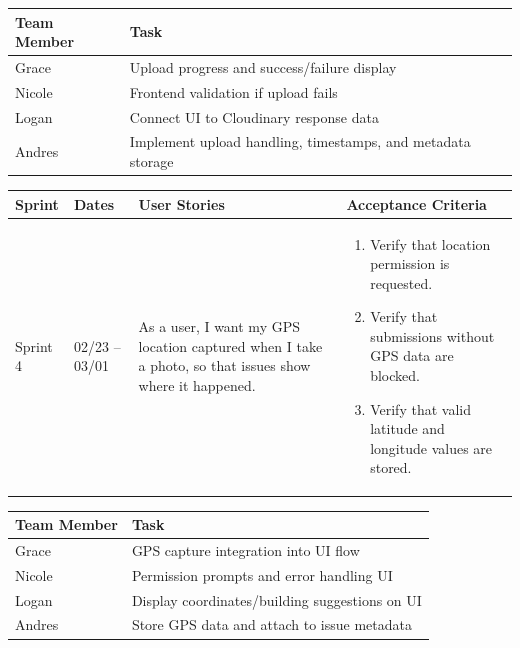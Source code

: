 \documentclass[11pt]{article}
\begin{document}
\vspace{0.5em}

\noindent
\begin{tabular}{|L{2.5cm}|L{12.5cm}|}
\hline
\textbf{Team Member} & \textbf{Task} \\
\hline
Grace & Upload progress and success/failure display \\
\hline
Nicole & Frontend validation if upload fails \\
\hline
Logan & Connect UI to Cloudinary response data \\
\hline
Andres & Implement upload handling, timestamps, and metadata storage \\
\hline
\end{tabular}

\vspace{2em}


\vspace{0.5em}

\noindent
\begin{tabular}{|L{1.2cm}|L{1.8cm}|L{5.2cm}|L{6.3cm}|}
\hline
\textbf{Sprint} & \textbf{Dates} & \textbf{User Stories} & \textbf{Acceptance Criteria} \\
\hline
Sprint 4 & 02/23 -- 03/01 &
As a user, I want my GPS location captured when I take a photo, so that issues show where it happened. &
\begin{enumerate}
    \item Verify that location permission is requested.
    \item Verify that submissions without GPS data are blocked.
    \item Verify that valid latitude and longitude values are stored.
\end{enumerate} \\
\hline
\end{tabular}

\vspace{0.5em}

\noindent
\begin{tabular}{|L{2.5cm}|L{12.5cm}|}
\hline
\textbf{Team Member} & \textbf{Task} \\
\hline
Grace & GPS capture integration into UI flow \\
\hline
Nicole & Permission prompts and error handling UI \\
\hline
Logan & Display coordinates/building suggestions on UI \\
\hline
Andres & Store GPS data and attach to issue metadata \\
\hline
\end{tabular}
\end{document}
